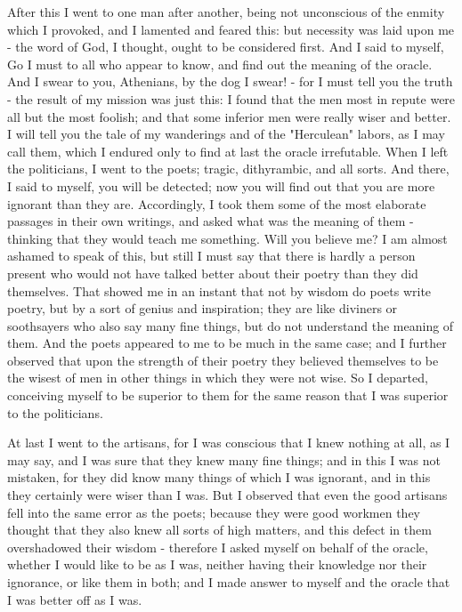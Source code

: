 \documentclass[11pt]{article}
\begin{document}
After this I went to one man after another, being not unconscious of the enmity which I provoked, and I lamented and feared this: but necessity was laid upon me - the word of God, I thought, ought to be considered first. And I said to myself, Go I must to all who appear to know, and find out the meaning of the oracle. And I swear to you, Athenians, by the dog I swear! - for I must tell you the truth - the result of my mission was just this: I found that the men most in repute were all but the most foolish; and that some inferior men were really wiser and better. I will tell you the tale of my wanderings and of the "Herculean" labors, as I may call them, which I endured only to find at last the oracle irrefutable. When I left the politicians, I went to the poets; tragic, dithyrambic, and all sorts. And there, I said to myself, you will be detected; now you will find out that you are more ignorant than they are. Accordingly, I took them some of the most elaborate passages in their own writings, and asked what was the meaning of them - thinking that they would teach me something. Will you believe me? I am almost ashamed to speak of this, but still I must say that there is hardly a person present who would not have talked better about their poetry than they did themselves. That showed me in an instant that not by wisdom do poets write poetry, but by a sort of genius and inspiration; they are like diviners or soothsayers who also say many fine things, but do not understand the meaning of them. And the poets appeared to me to be much in the same case; and I further observed that upon the strength of their poetry they believed themselves to be the wisest of men in other things in which they were not wise. So I departed, conceiving myself to be superior to them for the same reason that I was superior to the politicians.

At last I went to the artisans, for I was conscious that I knew nothing at all, as I may say, and I was sure that they knew many fine things; and in this I was not mistaken, for they did know many things of which I was ignorant, and in this they certainly were wiser than I was. But I observed that even the good artisans fell into the same error as the poets; because they were good workmen they thought that they also knew all sorts of high matters, and this defect in them overshadowed their wisdom - therefore I asked myself on behalf of the oracle, whether I would like to be as I was, neither having their knowledge nor their ignorance, or like them in both; and I made answer to myself and the oracle that I was better off as I was.
\end{document}

